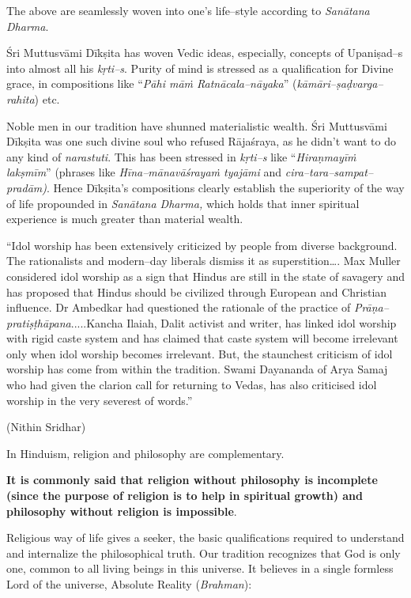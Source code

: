 The above are seamlessly woven into one’s life–style according to \textit{Sanātana Dharma}.

Śri Muttusvāmi Dīkṣita has woven Vedic ideas, especially, concepts of Upaniṣad–s into almost all his \textit{kṛti–s}. Purity of mind is stressed as a qualification for Divine grace, in compositions like “\textit{Pāhi māṁ Ratnācala–nāyaka}” (\textit{kāmāri–ṣaḍvarga–rahita}) etc.

Noble men in our tradition have shunned materialistic wealth. Śri Muttusvāmi Dīkṣita was one such divine soul who refused Rājaśraya, as he didn’t want to do any kind of \textit{narastuti}. This has been stressed in \textit{kṛti–s} like “\textit{Hiraṇmayīṁ lakṣmīm}” (phrases like \textit{Hīna–mānavāśrayaṁ tyajāmi} and \textit{cira–tara–sampat–pradām)}. Hence Dīkṣita’s compositions clearly establish the superiority of the way of life propounded in \textit{Sanātana Dharma,} which holds that inner spiritual experience is much greater than material wealth.

\begin{myquote}
“Idol worship has been extensively criticized by people from diverse background. The rationalists and modern–day liberals dismiss it as superstition…. Max Muller considered idol worship as a sign that Hindus are still in the state of savagery and has proposed that Hindus should be civilized through European and Christian influence. Dr Ambedkar had questioned the rationale of the practice of \textit{Prāṇa–pratiṣṭhāpana}.....Kancha Ilaiah, Dalit activist and writer, has linked idol worship with rigid caste system and has claimed that caste system will become irrelevant only when idol worship becomes irrelevant. But, the staunchest criticism of idol worship has come from within the tradition. Swami Dayananda of Arya Samaj who had given the clarion call for returning to Vedas, has also criticised idol worship in the very severest of words.”
\end{myquote}

\begin{flushright}
(Nithin Sridhar)
\end{flushright}

In Hinduism, religion and philosophy are complementary.

\textbf{It is commonly said that religion without philosophy is incomplete (since the purpose of religion is to help in spiritual growth) and philosophy without religion is impossible}.

Religious way of life gives a seeker, the basic qualifications required to understand and internalize the philosophical truth. Our tradition recognizes that God is only one, common to all living beings in this universe. It believes in a single formless Lord of the universe, Absolute Reality (\textit{Brahman}):

